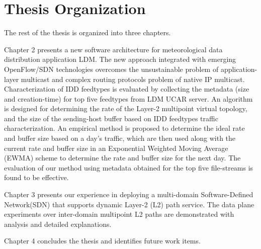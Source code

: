 \section{Thesis Organization}
The rest of the thesis is organized into three chapters.

Chapter 2 presents a new software architecture for meteorological data distribution application LDM. The new approach integrated with emerging OpenFlow/SDN technologies overcomes the unsustainable problem of application-layer multicast and complex routing protocols problem of native IP multicast. Characterization of IDD feedtypes is evaluated by collecting the metadata (size and creation-time) for top five feedtypes from LDM UCAR server. An algorithm is designed for determining the rate of the Layer-2 multipoint virtual topology, and the size of the sending-host buffer based on IDD feedtypes traffic characterization. An empirical method is proposed to determine the ideal rate and buffer size based on a day's traffic, which are then used along with the current rate and buffer size in an Exponential Weighted Moving Average (EWMA) scheme to determine the rate and buffer size for the next day. The evaluation of our method using metadata obtained for the top five file-streams is found to be effective.  

Chapter 3 presents our experience in deploying a multi-domain Software-Defined Network(SDN) that supports dynamic Layer-2 (L2) path service. The data plane experiments over inter-domain multipoint L2 paths are demonstrated with analysis and detailed explanations.   

Chapter 4 concludes the thesis and identifies future work items.




